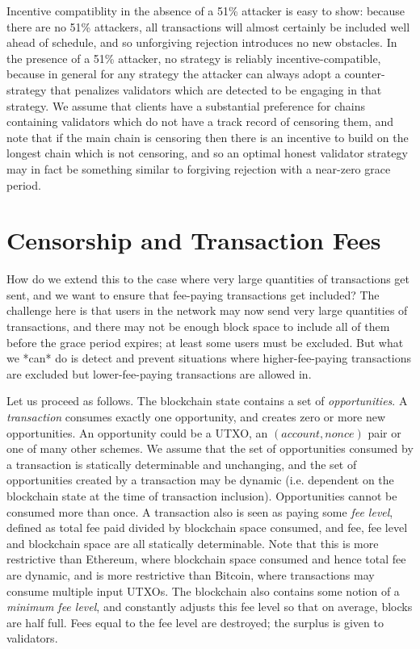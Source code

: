 \documentclass[12pt]{article}
\begin{document}
Incentive compatiblity in the absence of a 51\% attacker is easy to show: because there are no 51\% attackers, all transactions will almost certainly be included well ahead of schedule, and so unforgiving rejection introduces no new obstacles. In the presence of a 51\% attacker, no strategy is reliably incentive-compatible, because in general for any strategy the attacker can always adopt a counter-strategy that penalizes validators which are detected to be engaging in that strategy. We assume that clients have a substantial preference for chains containing validators which do not have a track record of censoring them, and note that if the main chain is censoring then there is an incentive to build on the longest chain which is not censoring, and so an optimal honest validator strategy may in fact be something similar to forgiving rejection with a near-zero grace period.

\section{Censorship and Transaction Fees}

How do we extend this to the case where very large quantities of transactions get sent, and we want to ensure that fee-paying transactions get included? The challenge here is that users in the network may now send very large quantities of transactions, and there may not be enough block space to include all of them before the grace period expires; at least some users must be excluded. But what we *can* do is detect and prevent situations where higher-fee-paying transactions are excluded but lower-fee-paying transactions are allowed in.

Let us proceed as follows. The blockchain state contains a set of \textit{opportunities}. A \textit{transaction} consumes exactly one opportunity, and creates zero or more new opportunities. An opportunity could be a UTXO, an $(account, nonce)$ pair or one of many other schemes. We assume that the set of opportunities consumed by a transaction is statically determinable and unchanging, and the set of opportunities created by a transaction may be dynamic (i.e. dependent on the blockchain state at the time of transaction inclusion). Opportunities cannot be consumed more than once. A transaction also is seen as paying some \textit{fee level}, defined as total fee paid divided by blockchain space consumed, and fee, fee level and blockchain space are all statically determinable. Note that this is more restrictive than Ethereum, where blockchain space consumed and hence total fee are dynamic, and is more restrictive than Bitcoin, where transactions may consume multiple input UTXOs. The blockchain also contains some notion of a \textit{minimum fee level}, and constantly adjusts this fee level so that on average, blocks are half full. Fees equal to the fee level are destroyed; the surplus is given to validators.
\end{document}
